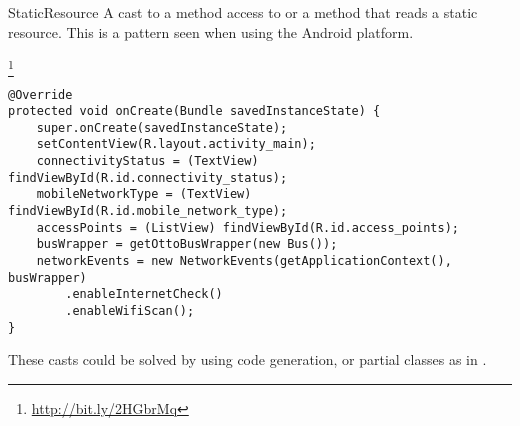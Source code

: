 \begin{pattern}{StaticResource}
%
%
A cast to a method access to  or a method that reads a static resource.
This is a pattern seen when using the Android platform. 

\instances{}

\footnote{\url{http://bit.ly/2HGbrMq}}

\begin{verbatim}
@Override
protected void onCreate(Bundle savedInstanceState) {
    super.onCreate(savedInstanceState);
    setContentView(R.layout.activity_main);
    connectivityStatus = (TextView) findViewById(R.id.connectivity_status);
    mobileNetworkType = (TextView) findViewById(R.id.mobile_network_type);
    accessPoints = (ListView) findViewById(R.id.access_points);
    busWrapper = getOttoBusWrapper(new Bus());
    networkEvents = new NetworkEvents(getApplicationContext(), busWrapper)
        .enableInternetCheck()
        .enableWifiScan();
}
\end{verbatim}

\detection{}

\discussion{}
%
%
These casts could be solved by using code generation,
or partial classes as in \csharp{}.

\end{pattern}